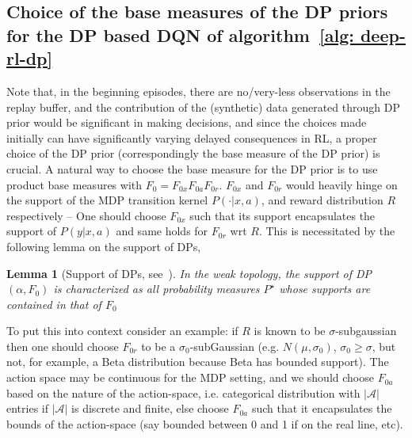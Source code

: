 \documentclass[10pt]{article}
\newtheorem{lem}{Lemma}
\begin{document}
\subsection{Choice of the base measures of the DP priors for the DP based DQN of algorithm~\ref{alg: deep-rl-dp}}
\label{sec:dp-dqn-base-choice}


Note that, in the beginning episodes, there are no/very-less observations in the replay buffer, and the contribution of the (synthetic) data generated through DP prior would be significant in making decisions, and since the choices made initially can have significantly varying delayed consequences in RL, a proper choice of the DP prior (correspondingly the base measure of the DP prior) is crucial. A natural way to choose the base measure for the DP prior is to use product base measures with $F_{0}= F_{0x} F_{0a} F_{0r}$. $F_{0x}$ and $F_{0r}$ would heavily hinge on the support of the MDP transition kernel $P(\cdot|x,a)$, and reward distribution $R$ respectively -- One should choose $F_{0x}$ such that its support encapsulates the support  of $P(y|x,a)$ and same holds for $F_{0r}$ wrt $R$. This is necessitated by the following lemma on the support of DPs,

\begin{lem}[Support of DPs, see~\citep{ghosal2010dirichlet}] \label{thm:Support-of-DPs} 
In the \textit{weak topology}, the support of DP$(\alpha,F_{0})$ is characterized as all probability measures $P^\star$ whose supports are contained in that of $F_{0}$
\end{lem}


To put this into context consider an example: if $R$ is known to be $\sigma$-subgaussian then one should choose $F_{0r}$ to be a $\sigma_{0}$-subGaussian (e.g. $N(\mu, \sigma_{0})$, $\sigma_{0}\geq \sigma$, but not, for example, a Beta distribution because Beta has  bounded support).  The action space may be continuous for the MDP setting, and we should choose  $F_{0a}$ based on the nature of the action-space, i.e. categorical distribution with $|\mathcal{A}|$ entries if $|\mathcal{A}|$ is discrete and finite, else choose $F_{0a}$ such that it encapsulates the bounds of the action-space (say bounded between 0 and 1 if on the real line, etc). 













\end{document}
